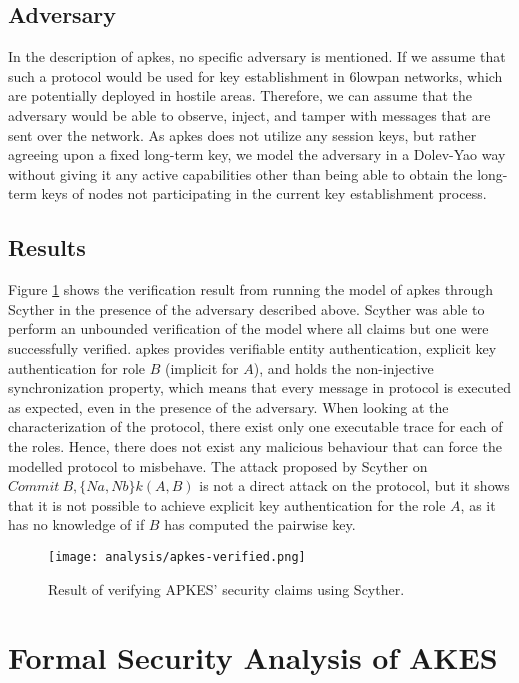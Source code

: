 \subsection{Adversary}

In the description of \gls{apkes}, no specific adversary is mentioned. If we assume that such a protocol would be used for key establishment in \gls{6lowpan} networks, which are potentially deployed in hostile areas. Therefore, we can assume that the adversary would be able to observe, inject, and tamper with messages that are sent over the network. As \gls{apkes} does not utilize any session keys, but rather agreeing upon a fixed long-term key, we model the adversary in a Dolev-Yao way without giving it any active capabilities other than being able to obtain the long-term keys of nodes not participating in the current key establishment process. 

\subsection{Results}

Figure \ref{fig:apkes-verified} shows the verification result from running the model of \gls{apkes} through Scyther in the presence of the adversary described above. Scyther was able to perform an unbounded verification of the model where all claims but one were successfully verified. \gls{apkes} provides verifiable entity authentication, explicit key authentication for role $B$ (implicit for $A$), and holds the non-injective synchronization property, which means that every message in protocol is executed as expected, even in the presence of the adversary. When looking at the characterization of the protocol, there exist only one executable trace for each of the roles. Hence, there does not exist any malicious behaviour that can force the modelled protocol to misbehave. The attack proposed by Scyther on $Commit\ B, \{Na, Nb\}k(A,B)$ is not a direct attack on the protocol, but it shows that it is not possible to achieve explicit key authentication for the role $A$, as it has no knowledge of if $B$ has computed the pairwise key. 


\begin{figure}[h]
	\centering
	\texttt{[image: analysis/apkes-verified.png]}
	\caption{Result of verifying APKES' security claims using Scyther.}
	\label{fig:apkes-verified}
\end{figure}



\section{Formal Security Analysis of AKES}


